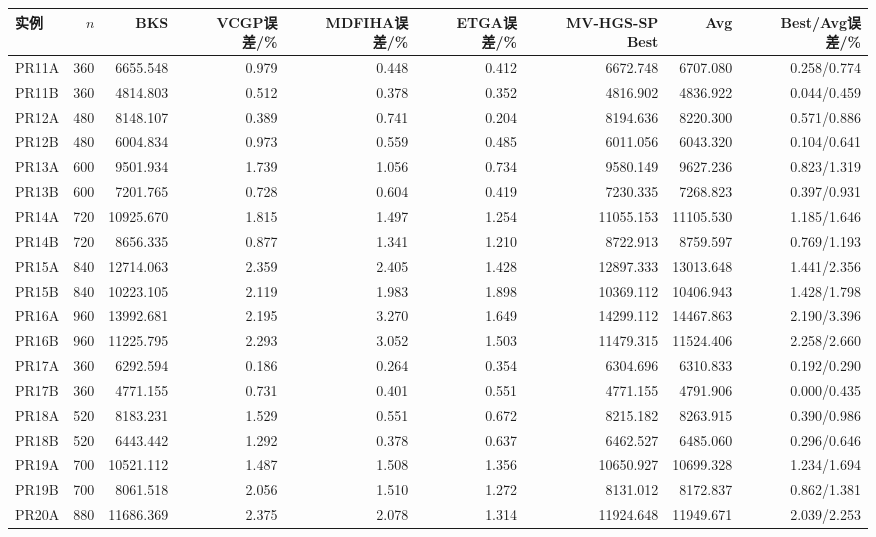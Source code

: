 \begin{tabular}{lrrrrrrrr}
\toprule
实例 & $n$ & BKS & VCGP误差/\% & MDFIHA误差/\% & ETGA误差/\% & MV-HGS-SP Best & Avg & Best/Avg误差/\% \\
\midrule
PR11A & 360 & 6655.548 & 0.979 & 0.448 & 0.412 & 6672.748 & 6707.080 & 0.258/0.774 \\
PR11B & 360 & 4814.803 & 0.512 & 0.378 & 0.352 & 4816.902 & 4836.922 & 0.044/0.459 \\
PR12A & 480 & 8148.107 & 0.389 & 0.741 & 0.204 & 8194.636 & 8220.300 & 0.571/0.886 \\
PR12B & 480 & 6004.834 & 0.973 & 0.559 & 0.485 & 6011.056 & 6043.320 & 0.104/0.641 \\
PR13A & 600 & 9501.934 & 1.739 & 1.056 & 0.734 & 9580.149 & 9627.236 & 0.823/1.319 \\
PR13B & 600 & 7201.765 & 0.728 & 0.604 & 0.419 & 7230.335 & 7268.823 & 0.397/0.931 \\
PR14A & 720 & 10925.670 & 1.815 & 1.497 & 1.254 & 11055.153 & 11105.530 & 1.185/1.646 \\
PR14B & 720 & 8656.335 & 0.877 & 1.341 & 1.210 & 8722.913 & 8759.597 & 0.769/1.193 \\
PR15A & 840 & 12714.063 & 2.359 & 2.405 & 1.428 & 12897.333 & 13013.648 & 1.441/2.356 \\
PR15B & 840 & 10223.105 & 2.119 & 1.983 & 1.898 & 10369.112 & 10406.943 & 1.428/1.798 \\
PR16A & 960 & 13992.681 & 2.195 & 3.270 & 1.649 & 14299.112 & 14467.863 & 2.190/3.396 \\
PR16B & 960 & 11225.795 & 2.293 & 3.052 & 1.503 & 11479.315 & 11524.406 & 2.258/2.660 \\
PR17A & 360 & 6292.594 & 0.186 & 0.264 & 0.354 & 6304.696 & 6310.833 & 0.192/0.290 \\
PR17B & 360 & 4771.155 & 0.731 & 0.401 & 0.551 & 4771.155 & 4791.906 & 0.000/0.435 \\
PR18A & 520 & 8183.231 & 1.529 & 0.551 & 0.672 & 8215.182 & 8263.915 & 0.390/0.986 \\
PR18B & 520 & 6443.442 & 1.292 & 0.378 & 0.637 & 6462.527 & 6485.060 & 0.296/0.646 \\
PR19A & 700 & 10521.112 & 1.487 & 1.508 & 1.356 & 10650.927 & 10699.328 & 1.234/1.694 \\
PR19B & 700 & 8061.518 & 2.056 & 1.510 & 1.272 & 8131.012 & 8172.837 & 0.862/1.381 \\
PR20A & 880 & 11686.369 & 2.375 & 2.078 & 1.314 & 11924.648 & 11949.671 & 2.039/2.253 \\

\end{tabular}
